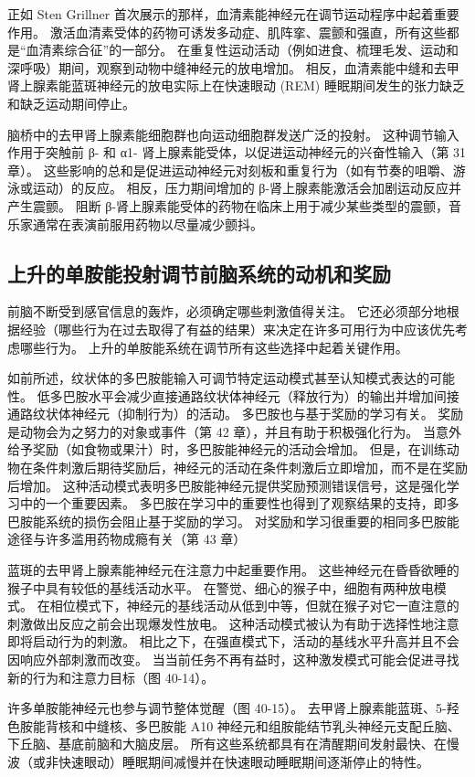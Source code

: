 正如 Sten Grillner 首次展示的那样，血清素能神经元在调节运动程序中起着重要作用。 激活血清素受体的药物可诱发多动症、肌阵挛、震颤和强直，所有这些都是“血清素综合征”的一部分。 在重复性运动活动（例如进食、梳理毛发、运动和深呼吸）期间，观察到动物中缝神经元的放电增加。 相反，血清素能中缝和去甲肾上腺素能蓝斑神经元的放电实际上在快速眼动 (REM) 睡眠期间发生的张力缺乏和缺乏运动期间停止。

脑桥中的去甲肾上腺素能细胞群也向运动细胞群发送广泛的投射。 这种调节输入作用于突触前 β- 和 α1- 肾上腺素能受体，以促进运动神经元的兴奋性输入（第 31 章）。 这些影响的总和是促进运动神经元对刻板和重复行为（如有节奏的咀嚼、游泳或运动）的反应。 相反，压力期间增加的 β-肾上腺素能激活会加剧运动反应并产生震颤。 阻断 β-肾上腺素能受体的药物在临床上用于减少某些类型的震颤，音乐家通常在表演前服用药物以尽量减少颤抖。

\subsection{上升的单胺能投射调节前脑系统的动机和奖励}
前脑不断受到感官信息的轰炸，必须确定哪些刺激值得关注。 它还必须部分地根据经验（哪些行为在过去取得了有益的结果）来决定在许多可用行为中应该优先考虑哪些行为。 上升的单胺能系统在调节所有这些选择中起着关键作用。

如前所述，纹状体的多巴胺能输入可调节特定运动模式甚至认知模式表达的可能性。 低多巴胺水平会减少直接通路纹状体神经元（释放行为）的输出并增加间接通路纹状体神经元（抑制行为）的活动。 多巴胺也与基于奖励的学习有关。 奖励是动物会为之努力的对象或事件（第 42 章），并且有助于积极强化行为。 当意外给予奖励（如食物或果汁）时，多巴胺能神经元的活动会增加。 但是，在训练动物在条件刺激后期待奖励后，神经元的活动在条件刺激后立即增加，而不是在奖励后增加。 这种活动模式表明多巴胺能神经元提供奖励预测错误信号，这是强化学习中的一个重要因素。 多巴胺在学习中的重要性也得到了观察结果的支持，即多巴胺能系统的损伤会阻止基于奖励的学习。 对奖励和学习很重要的相同多巴胺能途径与许多滥用药物成瘾有关（第 43 章）

蓝斑的去甲肾上腺素能神经元在注意力中起重要作用。 这些神经元在昏昏欲睡的猴子中具有较低的基线活动水平。 在警觉、细心的猴子中，细胞有两种放电模式。 在相位模式下，神经元的基线活动从低到中等，但就在猴子对它一直注意的刺激做出反应之前会出现爆发性放电。 这种活动模式被认为有助于选择性地注意即将启动行为的刺激。 相比之下，在强直模式下，活动的基线水平升高并且不会因响应外部刺激而改变。 当当前任务不再有益时，这种激发模式可能会促进寻找新的行为和注意力目标（图 40-14）。

许多单胺能神经元也参与调节整体觉醒（图 40-15）。 去甲肾上腺素能蓝斑、5-羟色胺能背核和中缝核、多巴胺能 A10 神经元和组胺能结节乳头神经元支配丘脑、下丘脑、基底前脑和大脑皮层。 所有这些系统都具有在清醒期间发射最快、在慢波（或非快速眼动）睡眠期间减慢并在快速眼动睡眠期间逐渐停止的特性。

